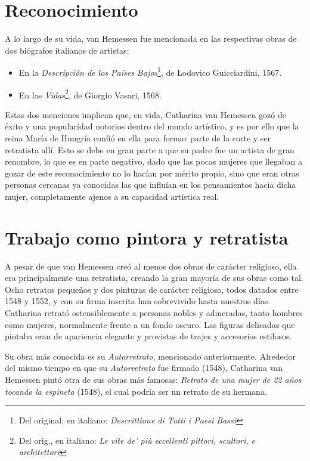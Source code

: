 \documentclass[12pt]{report}
\begin{document}
\section{Reconocimiento}

A lo largo de su vida, van Hemessen fue mencionada en las respectivas obras de dos biógrafos italianos de artistas:
\begin{itemize}
	\item En la \textit{Descripción de los Países Bajos}\footnote{Del original, en italiano: \textit{Descrittione di Tutti i Paesi Bassi}}, de Lodovico Guicciardini, 1567.
	\item En las \textit{Vidas}\footnote{Del orig., en italiano: \textit{Le vite de' più eccellenti pittori, scultori, e architettori}}, de Giorgio Vasari, 1568.
\end{itemize}

Estas dos menciones implican que, en vida, Catharina van Hemessen gozó de éxito y una popularidad notorios dentro del mundo artístico, y es por ello que la reina María de Hungría confió en ella para formar parte de la corte y ser retratista allí. Esto se debe en gran parte a que su padre fue un artista de gran renombre, lo que es en parte negativo, dado que las pocas mujeres que llegaban a gozar de este reconocimiento no lo hacían por mérito propio, sino que eran otras personas cercanas ya conocidas las que influían en los pensamientos hacia dicha mujer, completamente ajenos a su capacidad artística real.

\section{Trabajo como pintora y retratista}

A pesar de que van Hemessen creó al menos dos obras de carácter religioso, ella era principalmente una retratista, creando la gran mayoría de sus obras como tal. Ocho retratos pequeños y dos pinturas de carácter religioso, todos datados entre 1548 y 1552, y con su firma inscrita han sobrevivido hasta nuestros días. Catharina retrató ostensiblemente a personas nobles y adineradas, tanto hombres como mujeres, normalmente frente a un fondo oscuro. Las figuras delicadas que pintaba eran de apariencia elegante y provistas de trajes y accesorios estilosos.\bigskip

Su obra más conocida es su \textit{Autorretrato}, mencionado anteriormente. Alrededor del mismo tiempo en que su \textit{Autorretrato} fue firmado (1548), Catharina van Hemessen pintó otra de sus obras más famosas: \textit{Retrato de una mujer de 22 años tocando la espineta} (1548), el cual podría ser un retrato de su hermana.\bigskip
\end{document}

